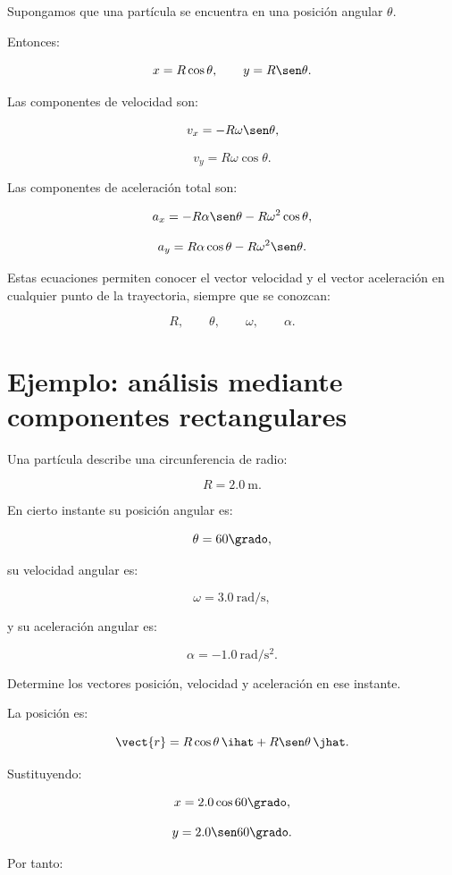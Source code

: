 Supongamos que una partícula se encuentra en una posición angular \(\theta\).

Entonces:

\[
x=R\cos\theta,
\qquad
y=R\sen\theta.
\]

Las componentes de velocidad son:

\[
v_x=-R\omega\sen\theta,
\]

\[
v_y=R\omega\cos\theta.
\]

Las componentes de aceleración total son:

\[
a_x
=
-R\alpha\sen\theta-R\omega^2\cos\theta,
\]

\[
a_y
=
R\alpha\cos\theta-R\omega^2\sen\theta.
\]

Estas ecuaciones permiten conocer el vector velocidad y el vector aceleración
en cualquier punto de la trayectoria, siempre que se conozcan:

\[
R,\qquad
\theta,\qquad
\omega,\qquad
\alpha.
\]


\section{Ejemplo: análisis mediante componentes rectangulares}

\begin{ejemplo}

Una partícula describe una circunferencia de radio:

\[
R=\SI{2.0}{\meter}.
\]

En cierto instante su posición angular es:

\[
\theta=60\grado,
\]

su velocidad angular es:

\[
\omega=\SI{3.0}{\radian\per\second},
\]

y su aceleración angular es:

\[
\alpha=-\SI{1.0}{\radian\per\second\squared}.
\]

Determine los vectores posición, velocidad y aceleración en ese instante.

\end{ejemplo}

La posición es:

\[
\vect{r}
=
R\cos\theta\,\ihat
+
R\sen\theta\,\jhat.
\]

Sustituyendo:

\[
x=2.0\cos60\grado,
\]

\[
y=2.0\sen60\grado.
\]

Por tanto:

